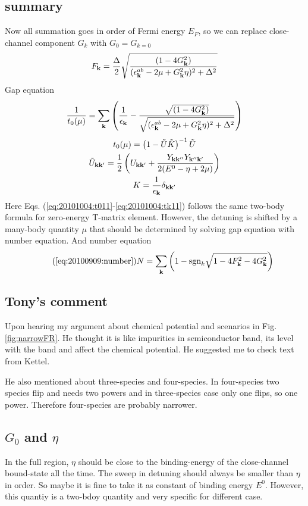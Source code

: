 \subsection{summary}
Now all summation goes in order of Fermi energy $E_F$, so we can replace close-channel component $G_k$ with $G_0=G_{k=0}$
\begin{equation}
F_{\mathbf{k}}=\frac{\Delta}2\sqrt{\frac{(1-4G_{\mathbf{k}}^{2})}{(\epsilon^{ab}_{\mathbf{k}}-2\mu+  G_{\mathbf{k}}^2\eta)^{2}+\Delta^{2}}}
\end{equation}
Gap equation 
\begin{equation}\label{eq:20101004:gapS}
\frac{1}{{t_{0}}(\mu)}=\sum_{\mathbf{k}}
\left(\frac{1}{\epsilon_{\mathbf{k}}}-\frac{\sqrt{(1-4G_{\mathbf{k}}^{2})}}{\sqrt{{(\epsilon^{ab}_{\mathbf{k}}-2\mu+  G_{\mathbf{k}}^2\eta)^{2}+\Delta^{2}}}}\right)
\end{equation} 
\begin{gather}
{t_{0}}(\mu)=\left(1-\tilde{U}\tilde{ K}\right)^{-1}\tilde{U}\label{eq:20101004:t011}\\
\tilde{U}_{\mathbf{k}\mathbf{k}'}=\frac{1}{2} \left(U_{\mathbf{k}\mathbf{k}'}+\frac{Y_{\mathbf{k}\mathbf{k}''}Y_{\mathbf{k}''\mathbf{k}'}}{2(E^{0}-\eta+2\mu)}\right)\label{eq:20101004:tu11}\\
{K}=\frac{1}{\epsilon_{\mathbf{k}}}\delta_{\mathbf{k}\mathbf{k}'}\label{eq:20101004:tk11}
\end{gather}
Here Eqs. (\ref{eq:20101004:t011}-\ref{eq:20101004:tk11}) follows the same two-body formula for zero-energy T-matrix element.  However, the detuning is shifted by a many-body quantity $\mu$ that should be determined by solving gap equation with number equation.  
And number equation
\begin{equation}\tag{\ref{eq:20100909:number}}
N=\sum_{\vk} \left(1-\sgn_{k}\sqrt{1-4 F_{\vk}^2-4 G_{\vk}^2}\right)
\end{equation} 

\subsection{Tony's comment}
Upon hearing my argument about chemical potential and scenarios in Fig. \ref{fig:narrowFR}. He thought it is like impurities in semiconductor band, its level with the band and affect the chemical potential. He suggested me to check text from Kettel.  

He also mentioned about three-species and four-species.  In four-species two species flip and needs two powers and in three-species case only one flips, so one power.  Therefore four-species are probably narrower.  

\subsection{$G_0$ and $\eta$}
In the full region, $\eta$ should be close to the binding-energy of the close-channel bound-state all the time.  The sweep in detuning should always be smaller than $\eta$ in order.  So maybe it is fine to take it as constant of binding energy $E^0$.  However, this quantiy is a two-bdoy quantity and very specific for different case. 

